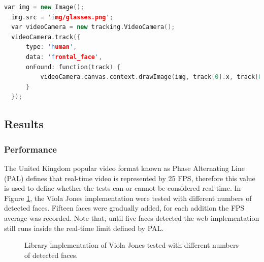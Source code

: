 \newpage

\begin{lstlisting}[language=C++,label={lst:viola},caption=Example of \textit{tracking.js} API of augmenting users faces with objects using Viola Jones face detection.]
  var img = new Image();
  img.src = 'img/glasses.png';
  var videoCamera = new tracking.VideoCamera();
  videoCamera.track({
      type: 'human',
      data: 'frontal_face',
      onFound: function(track) {
          videoCamera.canvas.context.drawImage(img, track[0].x, track[0].y, track[0].size, track[0].size);
      }
  });
\end{lstlisting}


\subsection{Results} %
\label{sub:evaluation:rapid_object_detection:results}

\subsubsection{Performance} %
\label{subsub:evaluation:rapid_object_detection:results:performance}

The United Kingdom popular video format known as Phase Alternating Line (PAL) \cite{PAL1962} defines that real-time video is represented by 25 FPS, therefore this value is used to define whether the tests can or cannot be considered real-time. In Figure \ref{figure:viola_fps}, the Viola Jones implementation were tested with different numbers of detected faces. Fifteen faces were gradually added, for each addition the FPS average was recorded. Note that, until five faces detected the web implementation still runs inside the real-time limit defined by PAL.

\begin{figure}[!htb]
  \centering
   \caption{Library implementation of Viola Jones tested with different numbers of detected faces.}
   \label{figure:viola_fps}
\end{figure}

